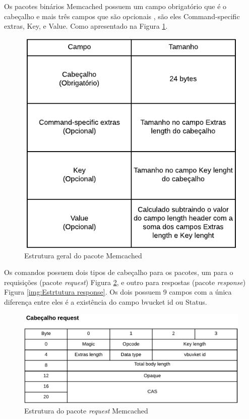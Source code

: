 Os pacotes binários Memcached possuem um campo obrigatório que é o cabeçalho e mais três campos que são opcionais , são eles Command-specific extras, Key, e Value. Como apresentado na Figura \ref{img:Estrtutura pkg_Mem}. \cite{MemcachedBinaryProtocol}

\begin{figure}[H]
     \centering
     \includegraphics[scale=1]{img/Estrutura_pacote_Memcached.pdf}
     \caption{Estrutura geral do pacote Memcached }
     \label{img:Estrtutura pkg_Mem}
\end{figure}

Os comandos possuem dois tipos de cabeçalho para os pacotes, um para o requisições (pacote \textit{request}) Figura \ref{img:Estrtutura request}, e outro para respostas (pacote \textit{response}) Figura \ref{img:Estrtutura response}. Os dois possuem 9 campos com a única diferença entre eles é a existência do campo bvucket id ou Status. 

\begin{figure}[H]
     \centering
     \includegraphics[scale=0.6]{img/Memcached_request_header.pdf}
     \caption{Estrutura do pacote \textit{request} Memcached }
     \label{img:Estrtutura request}
\end{figure}

